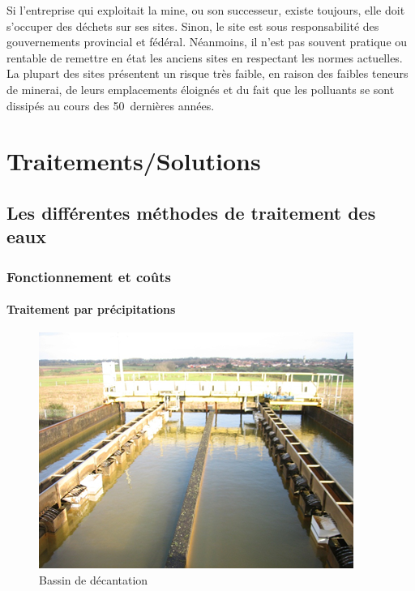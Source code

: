 \documentclass{article}
\begin{document}
Si l'entreprise qui exploitait la mine, ou son successeur, existe toujours, elle doit s'occuper des déchets sur ses sites. Sinon, le site est sous responsabilité des gouvernements provincial et fédéral. 
Néanmoins, il n'est pas souvent pratique ou rentable de remettre en état les anciens sites en respectant les normes actuelles. La plupart des sites présentent un risque très faible, en raison des faibles teneurs de minerai, de leurs emplacements éloignés et du fait que les polluants se sont dissipés au cours des 50~dernières années.

\newpage
\section{Traitements/Solutions}
\subsection{Les différentes méthodes de traitement des eaux}
\subsubsection{Fonctionnement et coûts}
\paragraph{Traitement par précipitations} \hspace{1 em}

\begin{figure}[H]
\centering
\includegraphics[width = 0.5\linewidth]{III_A_1.png}
\caption{Bassin de décantation}
\label{fig:bassin_decantation}
\end{figure}
\end{document}
